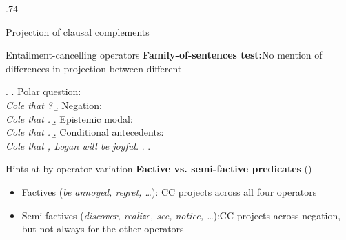 \documentclass[final, table]{beamer}
\newlength{\colwidth}
\newlength{\vboxsep}
\begin{document}
\begin{frame}[t]
\begin{columns}[t]
\begin{column}{.74\colwidth}
\begin{normalbox}{Projection of clausal complements}
{\begin{minipage}{1.7\linewidth}
					\end{minipage}
				}
			\end{normalbox}

			\vspace{\vboxsep}
			\begin{normalbox}{Entailment-cancelling operators}
				\textbf{Family-of-sentences test:}\newline No mention of differences in projection between different 
				
				\vspace{-.5\baselineskip}
				\ex. \a. Polar question:\\
					\textit{ Cole  that ?}
					\b. Negation:\\
					\textit{Cole   that .}
					\b. Epistemic modal:\\
					\textit{ Cole  that .}
					\b. Conditional antecedents:\\
					\textit{ Cole  that , Logan will be joyful.}
					\z.
				\z.

				\vspace{-.5\baselineskip}

			\end{normalbox}
			
			\vspace{\vboxsep}
			\begin{normalbox}{Hints at by-operator variation}
				\textbf{Factive vs. semi-factive predicates} (\citealt{karttunen_observations_1971})
				\vspace{-.2\baselineskip}
				\begin{itemize}
					\item Factives (\textit{be annoyed, regret, \dots}): CC projects across all four operators
					\item Semi-factives (\textit{discover, realize, see, notice, \dots}):\newline CC projects across negation, but not always for the other operators
				\end{itemize}


\end{normalbox}
\end{column}
\end{columns}
\end{frame}
\end{document}
